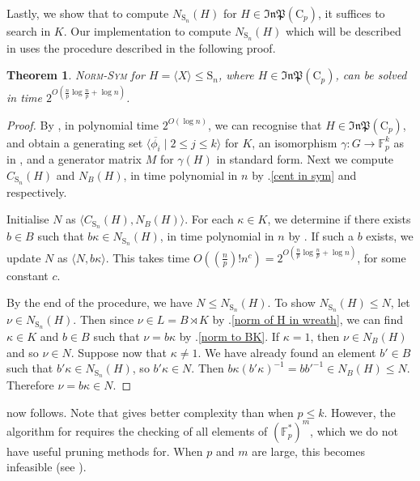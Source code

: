 \documentclass[11pt,a4paper]{article}
\newtheorem{theorem}{Theorem}[section]
\theoremstyle{definition}
\theoremstyle{remark}
\newcommand{\InP}{\mathfrak{InP}}
\newcommand{\Sy}{\mathrm{S}}
\newcommand{\Cy}{\mathrm{C}}
\begin{document}

Lastly, we show that to compute $N_{\Sy_n}(H)$ for $H \in \mathfrak{InP}(\Cy_p)$, it suffices to search in $K$. Our implementation to compute $N_{\Sy_n}(H)$ which will be described in  uses the procedure described in the following proof.

\begin{theorem} \label{thm: norm sym for our H in expo klogk}
\textsc{Norm-Sym} for $H = \langle X \rangle \leq \Sy_n$, where $H \in \InP(\Cy_p)$, can be solved in time $2^{O(\frac{n}{p} \log{\frac{n}{p}} + \log{n})}$. 
\end{theorem}

\begin{proof}
By , in polynomial time $2^{O(\log{n})}$, we can recognise that $H \in \InP(\Cy_p)$, and obtain a generating set $\langle \overline{\phi_i} \mid 2 \leq j \leq k \rangle$ for $K$, an isomorphism $\gamma: G \rightarrow \mathds{F}_p^k$ as in , and 
a generator matrix $M$ for $\gamma(H)$ in standard form. 
Next we compute $C_{\Sy_n}(H)$ and $N_{B}(H)$, in time polynomial in $n$ by .\ref{cent in sym} and  respectively. 

Initialise $N$ as $ \langle C_{\Sy_n}(H), N_{B}(H) \rangle$. 
For each $\kappa \in K$, we determine if there exists $b \in B$ such that $b \kappa \in N_{\Sy_n}(H)$, in time polynomial in $n$ by . If such a $b$ exists, we update $N$ as $\langle N, b \kappa \rangle$.
This takes time $O((\frac{n}{p})! n^c) = 2^{O(\frac{n}{p} \log{\frac{n}{p}} + \log{n})}$, for some constant $c$. 

By the end of the procedure, we have $N \leq N_{\Sy_n}(H)$. 
To show $N_{\Sy_n}(H) \leq N$, let $\nu \in N_{\Sy_n}(H)$.
Then since $\nu \in L =B \rtimes K$ by .\ref{norm of H in wreath}, we can find $\kappa \in K$ and $b \in B$ such that $\nu = b \kappa$ by .\ref{norm to BK}. If $\kappa=1$, then $\nu \in N_B(H)$ and so $\nu \in N$. 
Suppose now that $\kappa \neq 1$. 
We have already found an element $b' \in B$ such that $b' \kappa \in N_{\Sy_n}(H)$, so $b' \kappa \in N$. 
Then $b \kappa (b' \kappa)^{-1} = b b'^{-1} \in N_B(H) \leq N$. Therefore $\nu = b \kappa  \in N$. 
\end{proof}

 now follows. 
Note that  gives better complexity than  when $p \leq k$. 
However, the algorithm for  requires the checking of all elements of $(\mathds{F}_p^*)^m$, which we do not have useful pruning methods for. When $p$ and $m$ are large, this becomes infeasible (see ). 
\end{document}
